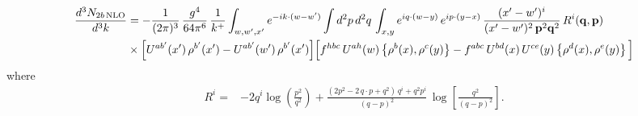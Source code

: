 \documentclass[9pt]{article}
\numberwithin{equation}{section}
\begin{document}
\begin{align}
\frac{d^{3}N_{2b\,\rm NLO}}{d^{3}k} & = -\frac{1}{(2\pi)^{3}}\,\frac{g^{4}}{64\pi^{6}}\,\frac{1}{k^{+}}\int_{w,w',x'} e^{-ik\cdot(w-w')}
\int d^{2}p\,d^{2}q\,\int_{x,y} e^{iq\cdot(w-y)}\,e^{ip\cdot(y-x)}\,\frac{(x'-w')^{i}}{(x'-w')^{2}\,\mathbf{p}^{2}\mathbf{q}^{2}}\,R^{i}(\mathbf{q},\mathbf{p})\notag\\
&\times\Big[U^{ab'}(x')\,\rho^{b'}(x')-U^{ab'}(w')\,\rho^{b'}(x')\Big]
\Big[f^{hbc}\,U^{ah}(w)\left\{\rho^{b}(x),\rho^{c}(y)\right\}-f^{abc}\,U^{bd}(x)\,U^{ce}(y)\left\{\rho^{d}(x),\rho^{e}(y)\right\}\Big]
\end{align}
where
\begin{align}
R^{i} =& -2q^{i}\log\left(\frac{p^{2}}{q^{2}}\right)
+\frac{(2p^{2}-2\,q\cdot p+q^{2})\,q^{i}+q^{2}p^{i}}{(q-p)^{2}}\,
\log\left[\frac{q^{2}}{(q-p)^{2}}\right].
\end{align}
\end{document}

